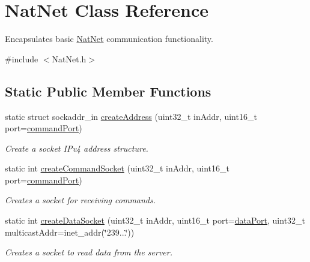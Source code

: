 \hypertarget{classNatNet}{\section{\-Nat\-Net \-Class \-Reference}
\label{classNatNet}
}


\-Encapsulates basic \hyperlink{classNatNet}{\-Nat\-Net} communication functionality.  




{\ttfamily \#include $<$\-Nat\-Net.\-h$>$}

\subsection*{\-Static \-Public \-Member \-Functions}
\begin{DoxyCompactItemize}
\item 
static struct sockaddr\-\_\-in \hyperlink{classNatNet_a1fd6d626e9c90af62fb3c7b881fb88ee}{create\-Address} (uint32\-\_\-t in\-Addr, uint16\-\_\-t port=\hyperlink{classNatNet_ab80fffaea8be5cb6630ee55ddb4d308b}{command\-Port})
\begin{DoxyCompactList}\small\item\em \-Create a socket \-I\-Pv4 address structure. \end{DoxyCompactList}\item 
static int \hyperlink{classNatNet_a98dd9ad26ce6baf0444f51f51812626a}{create\-Command\-Socket} (uint32\-\_\-t in\-Addr, uint16\-\_\-t port=\hyperlink{classNatNet_ab80fffaea8be5cb6630ee55ddb4d308b}{command\-Port})
\begin{DoxyCompactList}\small\item\em \-Creates a socket for receiving commands. \end{DoxyCompactList}\item 
static int \hyperlink{classNatNet_a33b6d6f52a107f1c0a6aaa2023b3be60}{create\-Data\-Socket} (uint32\-\_\-t in\-Addr, uint16\-\_\-t port=\hyperlink{classNatNet_ab9dfa191387ad103b5260f5a9642878d}{data\-Port}, uint32\-\_\-t multicast\-Addr=inet\-\_\-addr(\char`\"{}239...\char`\"{}))
\begin{DoxyCompactList}\small\item\em \-Creates a socket to read data from the server. \end{DoxyCompactList}\end{DoxyCompactItemize}
